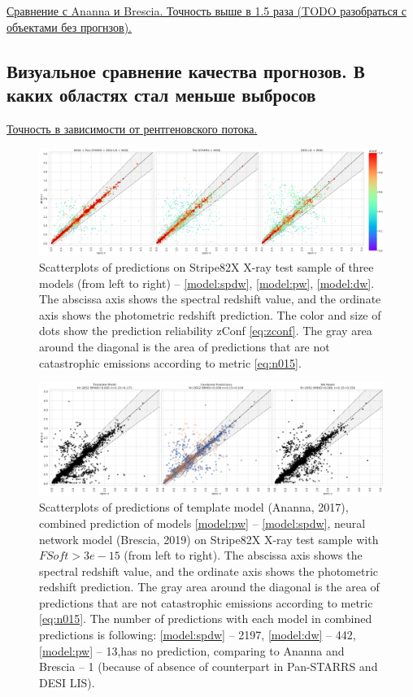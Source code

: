 \documentclass[fleqn,usenatbib]{mnras}
\begin{document}
\underline{Сравнение с Ananna и Brescia. Точность выше в 1.5 раза (TODO разобраться с объектами без прогнзов).}

\subsection{Визуальное сравнение качества прогнозов. В каких областях стал меньше выбросов}

\underline{Точность в зависимости от рентгеновского потока.}

\begin{figure}
    \centering
    \includegraphics[width=0.99\linewidth]{images/scatterplots-stripe82x-sorted.png}
    \caption{Scatterplots of predictions on Stripe82X X-ray test sample of three models (from left to right) -- \ref{model:spdw}, \ref{model:pw}, \ref{model:dw}. The abscissa axis shows the spectral redshift value, and the ordinate axis shows the photometric redshift prediction. The color and size of dots show the prediction reliability zConf \eqref{eq:zconf}. The gray area around the diagonal is the area of predictions that are not catastrophic emissions according to metric \eqref{eq:n015}.}
    \label{fig:scatter-s82x}
\end{figure}

\begin{figure}
    \centering
    \includegraphics[width=0.9\linewidth]{images/stripe82x-sota35-colored_final.png}
    \caption{Scatterplots of predictions of template model (Ananna, 2017), combined prediction of models \ref{model:pw} -- \ref{model:spdw}, neural network model (Brescia, 2019) on Stripe82X X-ray test sample with $FSoft > 3e-15$ (from left to right). The abscissa axis shows the spectral redshift value, and the ordinate axis shows the photometric redshift prediction. The gray area around the diagonal is the area of predictions that are not catastrophic emissions according to metric \eqref{eq:n015}. The number of predictions with each model in combined predictions is following: \ref{model:spdw} -- 2197, \ref{model:dw} -- 442, \ref{model:pw} -- 13,has no prediction, comparing to Ananna and Brescia -- 1 (because of absence of counterpart in Pan-STARRS and DESI LIS).}
    \label{fig:scatter-s82x-sota35}
\end{figure}
\end{document}
